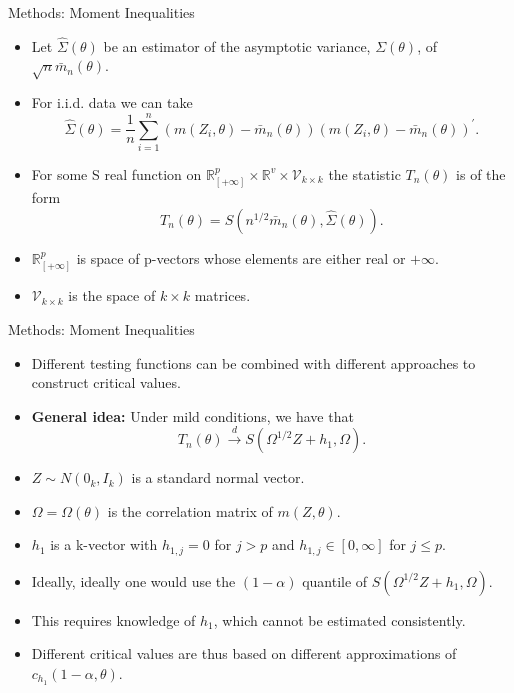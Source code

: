 \documentclass[aspectratio=169]{beamer}  %
\begin{document}
\begin{frame}{Methods: Moment Inequalities}
    \begin{itemize}
        
        \item Let $\hat{\Sigma}(\theta)$ be an estimator of the asymptotic variance, ${\Sigma}(\theta)$, of $\sqrt{n}\bar{m}_n(\theta)$.
        \item For i.i.d. data we can take $$\hat{\Sigma}(\theta)=\frac{1}{n}\sum_{i=1}^n(m(Z_i,\theta)-\bar{m}_n(\theta))(m(Z_i,\theta)-\bar{m}_n(\theta))^{\prime}.$$
        \item For some S real function on $\mathbb{R}_{[+\infty]}^p\times\mathbb{R}^v\times\mathcal{V}_{k\times k}$ the statistic $T_n(\theta)$ is of the form $$T_n(\theta)=S(n^{1/2}\bar{m}_n(\theta),\hat{\Sigma}(\theta)).$$
        \item $\mathbb{R}_{[+\infty]}^p$ is space of p-vectors whose elements are either real or $+\infty$.
        \item $\mathcal{V}_{k\times k}$ is the space of $k\times k$ matrices.
    \end{itemize}
\end{frame}

\begin{frame}{Methods: Moment Inequalities}
    \begin{itemize}
        
        \item Different testing functions can be combined with different approaches to construct critical values.
        \item \textbf{General idea:} Under mild conditions, we have that $$T_n(\theta)\overset{d}{\operatorname*{\operatorname*{\to}}}S(\Omega^{1/2}Z+h_1,\Omega).$$
        \item $Z\sim N(0_k,I_k)$ is a standard normal vector.
        \item $\Omega=\Omega(\theta)$ is the correlation matrix of $m(Z,\theta)$.
        \item $h_1$ is a k-vector with $h_{1,j}=0$ for $j>p$ and $h_{1,j}\in[0,\infty]$ for $j\leq p$.
        \item Ideally, ideally one would use the $(1-\alpha)$ quantile of $S(\Omega^{1/2}Z+h_1,\Omega)$.
        \item This requires knowledge of $h_1$, which cannot be estimated consistently.
        \item Different critical values are thus based on different approximations of $c_{h_1}(1-\alpha,\theta)$.
    \end{itemize}
\end{frame}
\end{document}

